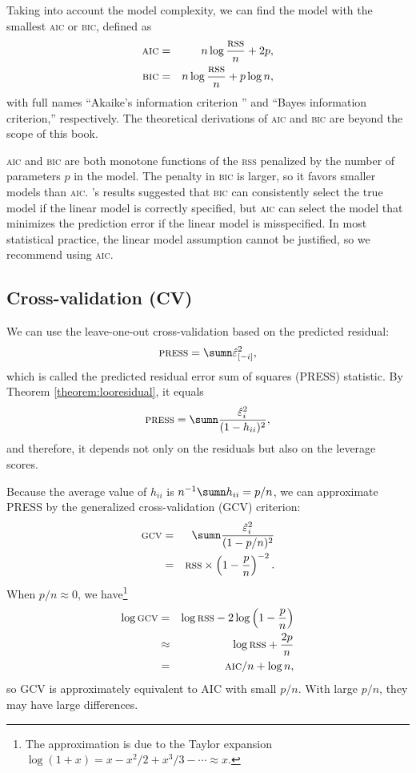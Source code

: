 Taking into account the model complexity, we can find the model with the smallest \textsc{aic} or \textsc{bic}, defined as
\begin{eqnarray*}
\textsc{aic} &=& n\log\frac{\textsc{rss}}{n}+2p , \\
\textsc{bic} &=& n\log\frac{\textsc{rss}}{n}+p\log n,
\end{eqnarray*}
with full names
``Akaike's information criterion '' and 
``Bayes information criterion,'' respectively. The theoretical derivations of \textsc{aic} and \textsc{bic} are beyond the scope of this book. 

\textsc{aic} and \textsc{bic} are both monotone functions of the \textsc{rss} penalized by the number of parameters $p$ in the model. The penalty in \textsc{bic} is larger, so it favors smaller models than \textsc{aic}. \citet{shao1997asymptotic}'s results suggested that \textsc{bic} can consistently select the true model if the linear model is correctly specified, but \textsc{aic} can select the model that minimizes the prediction error if the linear model is misspecified. In most statistical practice, the linear model assumption cannot be justified, so we recommend using \textsc{aic}. 




\subsection{Cross-validation (CV)}

We can use the leave-one-out cross-validation based on the predicted residual: 
$$
\textsc{press}=\sumn\hat{\varepsilon}_{[-i]}^{2}, 
$$
which is called the predicted residual error sum of squares (PRESS)
statistic. By Theorem \ref{theorem:looresidual}, it equals 
\begin{equation}
\label{eq::press-stat}
\textsc{press}
=\sumn\frac{\hat{\varepsilon}_i^{2}}{(1-h_{ii})^{2}},
\end{equation}
and therefore, it depends not only on the residuals but also on the leverage scores. 

Because the average value of $h_{ii}$ is $n^{-1}\sumn h_{ii}=p/n$,
we can approximate PRESS by the generalized cross-validation (GCV)
criterion:
\begin{eqnarray*}
\textsc{gcv} &=& \sumn\frac{\hat{\varepsilon}_i^{2}}{(1-p/n)^{2}}\\
&=&\textsc{rss}\times\left(1-\frac{p}{n}\right)^{-2}.
\end{eqnarray*}
When $p/n\approx0$, we have\footnote{The approximation is due to the Taylor expansion $\log(1+x) = x - x^2/2 + x^3/3 - \cdots \approx x$.}
\begin{eqnarray*}
\log\textsc{gcv} &=& \log\textsc{rss}-2\log\left(1-\frac{p}{n}\right)\\
&\approx &\log\textsc{rss}+\frac{2p}{n} \\
&=&\textsc{aic}/n+\log n,
\end{eqnarray*}
so GCV is approximately equivalent to AIC with small $p/n$. With large $p/n$, they may have large differences. 

